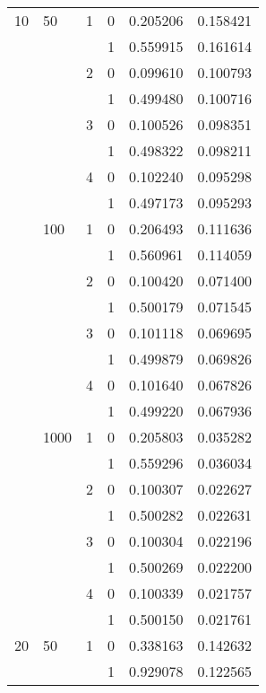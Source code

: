 \begin{tabular}{llllrr}
10 & 50   & 1 & 0 &        0.205206 &           0.158421 \\
   &      &   & 1 &        0.559915 &           0.161614 \\
   &      & 2 & 0 &        0.099610 &           0.100793 \\
   &      &   & 1 &        0.499480 &           0.100716 \\
   &      & 3 & 0 &        0.100526 &           0.098351 \\
   &      &   & 1 &        0.498322 &           0.098211 \\
   &      & 4 & 0 &        0.102240 &           0.095298 \\
   &      &   & 1 &        0.497173 &           0.095293 \\
   & 100  & 1 & 0 &        0.206493 &           0.111636 \\
   &      &   & 1 &        0.560961 &           0.114059 \\
   &      & 2 & 0 &        0.100420 &           0.071400 \\
   &      &   & 1 &        0.500179 &           0.071545 \\
   &      & 3 & 0 &        0.101118 &           0.069695 \\
   &      &   & 1 &        0.499879 &           0.069826 \\
   &      & 4 & 0 &        0.101640 &           0.067826 \\
   &      &   & 1 &        0.499220 &           0.067936 \\
   & 1000 & 1 & 0 &        0.205803 &           0.035282 \\
   &      &   & 1 &        0.559296 &           0.036034 \\
   &      & 2 & 0 &        0.100307 &           0.022627 \\
   &      &   & 1 &        0.500282 &           0.022631 \\
   &      & 3 & 0 &        0.100304 &           0.022196 \\
   &      &   & 1 &        0.500269 &           0.022200 \\
   &      & 4 & 0 &        0.100339 &           0.021757 \\
   &      &   & 1 &        0.500150 &           0.021761 \\
20 & 50   & 1 & 0 &        0.338163 &           0.142632 \\
   &      &   & 1 &        0.929078 &           0.122565 \\

\end{tabular}
